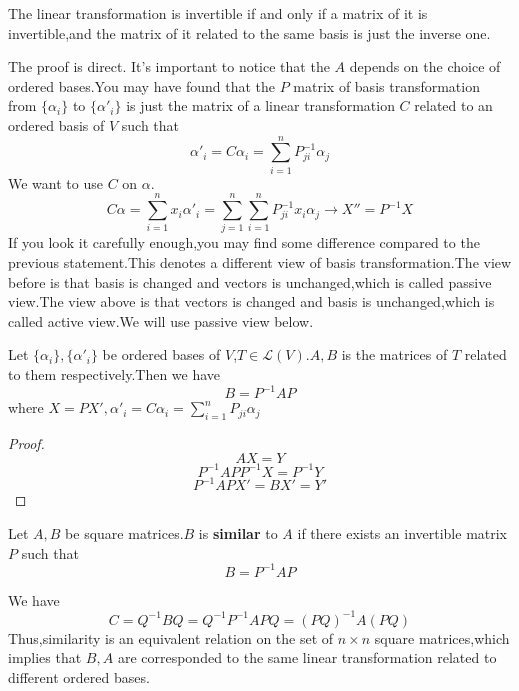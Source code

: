 \documentclass{article}
\begin{document}
\begin{thm}
	The linear transformation is invertible if and only if a matrix of it is invertible,and the matrix of it related to the same basis is just the inverse one.
\end{thm}
The proof is direct.
It's important to notice that the $A$ depends on the choice of ordered bases.You may have found that the $P$ matrix of basis transformation from $\{\alpha_i\}$ to $\{\alpha'_i\}$ is just the matrix of a linear transformation $C$ related to an ordered basis of $V$ such that
\[\alpha'_i=C\alpha_i=\sum\limits_{i=1}^nP^{-1}_{ji}\alpha_j\]
We want to use $C$ on $\alpha$.
\[C\alpha=\sum\limits_{i=1}^nx_i\alpha'_i=\sum\limits_{j=1}^n\sum\limits_{i=1}^nP^{-1}_{ji}x_i\alpha_j\rightarrow X''=P^{-1}X\]
If you look it carefully enough,you may find some difference compared to the previous statement.This denotes a different view of basis transformation.The view before is that basis is changed and vectors is unchanged,which is called passive view.The view above is that vectors is changed and basis is unchanged,which is called active view.We will use passive view below.\\
\begin{thm}
	Let $\{\alpha_i\},\{\alpha'_i\}$ be ordered bases of $V$,$T\in\mathcal{L}(V)$.$A,B$ is the matrices of $T$ related to them respectively.Then we have
	\[B=P^{-1}AP\]
	where $X=PX',\alpha'_i=C\alpha_i=\sum\limits_{i=1}^nP_{ji}\alpha_j$
\end{thm}
\begin{proof}
	\[AX=Y\]
	\[P^{-1}APP^{-1}X=P^{-1}Y\]
	\[P^{-1}APX'=BX'=Y'\]
\end{proof}
\begin{dde}
	Let $A,B$ be square matrices.$B$ is \textbf{similar} to $A$ if there exists an invertible matrix $P$ such that
	\[B=P^{-1}AP\]
\end{dde}
We have
\[C=Q^{-1}BQ=Q^{-1}P^{-1}APQ=(PQ)^{-1}A(PQ)\]
Thus,similarity is an equivalent relation on the set of $n\times n$ square matrices,which implies that $B,A$ are corresponded to the same linear transformation related to different ordered bases.
\end{document}
